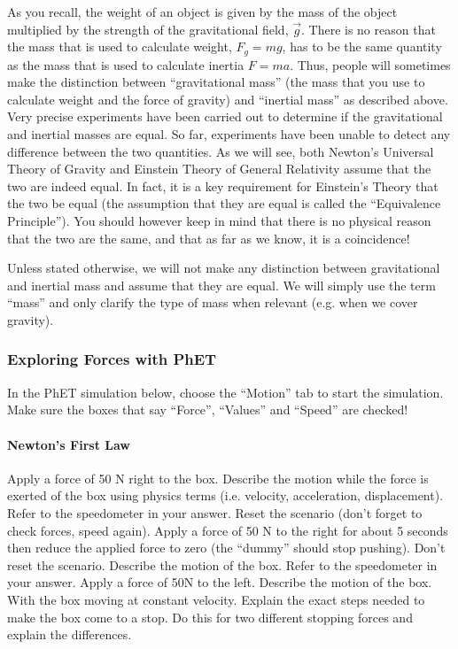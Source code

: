 As you recall, the weight of an object is given by the mass of the object multiplied by the strength of the gravitational field, $\vec g$. There is no reason that the mass that is used to calculate weight, $F_g=mg$, has to be the same quantity as the mass that is used to calculate inertia $F=ma$. Thus, people will sometimes make the distinction between ``gravitational mass'' (the mass that you use to calculate weight and the force of gravity) and ``inertial mass'' as described above. Very precise experiments have been carried out to determine if the gravitational and inertial masses are equal. So far, experiments have been unable to detect any difference between the two quantities. As we will see, both Newton's Universal Theory of Gravity and Einstein Theory of General Relativity assume that the two are indeed equal. In fact, it is a key requirement for Einstein's Theory that the two be equal (the assumption that they are equal is called the ``Equivalence Principle''). You should however keep in mind that there is no physical reason that the two are the same, and that as far as we know, it is a coincidence!

Unless stated otherwise, we will not make any distinction between gravitational and inertial mass and assume that they are equal. We will simply use the term ``mass'' and only clarify the type of mass when relevant (e.g. when we cover gravity).

\subsubsection{Exploring Forces with PhET}

In the PhET simulation below, choose the ``Motion'' tab to start the simulation. Make sure the boxes that say ``Force'', ``Values'' and ``Speed'' are checked!

\paragraph{Newton's First Law}

Apply a force of 50 N right to the box. Describe the motion while the force is exerted of the box using physics terms (i.e. velocity, acceleration, displacement). Refer to the speedometer in your answer.
Reset the scenario (don't forget to check forces, speed again). Apply a force of 50 N to the right for about 5 seconds then reduce the applied force to zero (the ``dummy'' should stop pushing). Don't reset the scenario. Describe the motion of the box. Refer to the speedometer in your answer.
Apply a force of 50N to the left. Describe the motion of the box.
With the box moving at constant velocity. Explain the exact steps needed to make the box come to a stop. Do this for two different stopping forces and explain the differences.


